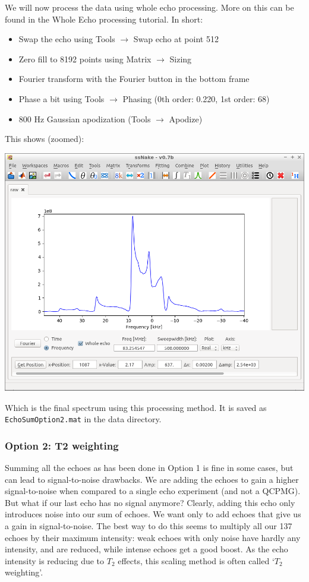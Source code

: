 \documentclass[11pt,a4paper]{article}
\begin{document}
We will now process the data using whole echo processing. More on this can be found in the Whole
Echo processing tutorial. In short:
\begin{itemize}
  \item Swap the echo using Tools $\longrightarrow$ Swap echo at point 512
  \item Zero fill to 8192 points using Matrix $\longrightarrow$ Sizing
  \item Fourier transform with the Fourier button in the bottom frame
  \item Phase a bit using Tools $\longrightarrow$ Phasing (0th order: 0.220, 1st order: 68)
  \item 800 Hz Gaussian apodization (Tools $\longrightarrow$ Apodize)
\end{itemize}
This shows (zoomed):
\begin{center}
\includegraphics[width=0.7\linewidth]{Figs/Fig6.png}
\end{center}
Which is the final spectrum using this processing method. It is saved as \texttt{EchoSumOption2.mat}
in the data directory.

\subsubsection{Option 2: T2 weighting}
Summing all the echoes as has been done in Option 1 is fine in some cases, but can lead to signal-to-noise
drawbacks. We are adding the echoes to gain a higher signal-to-noise when compared to a single echo
experiment (and not a QCPMG). But what if our last echo has no signal anymore? Clearly, adding this
echo only introduces noise into our sum of echoes. We want only to add echoes that give us a gain in
signal-to-noise. The best way to do this seems to multiply all our 137 echoes by their maximum
intensity: weak echoes with only noise have hardly any intensity, and are reduced, while intense
echoes get a good boost. As the echo intensity is reducing due to $T_2$ effects, this scaling method
is often called `$T_2$ weighting'.
\end{document}
